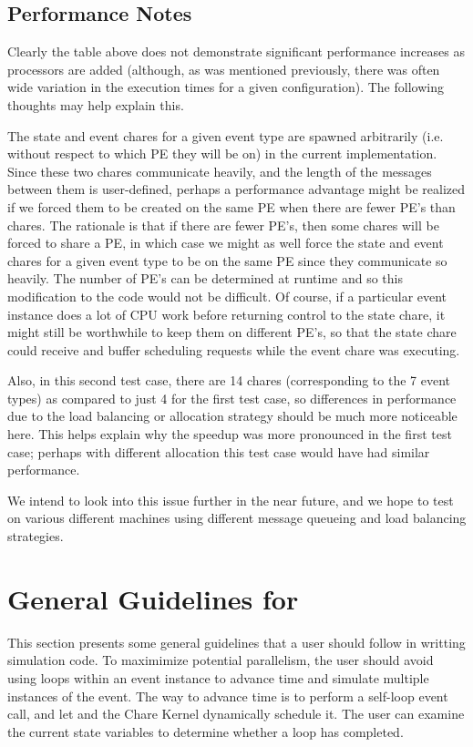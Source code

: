 \subsection{Performance Notes}

Clearly the table above does not demonstrate significant performance
increases as processors are added (although, as was mentioned
previously, there was often wide variation in the execution times for a
given configuration).  The following thoughts may help explain this.

The state and event chares for a given event type are spawned
arbitrarily (i.e. without respect to which PE they will be on) in the
current implementation.  Since these two chares communicate heavily, and
the length of the messages between them is user-defined, perhaps a
performance advantage might be realized if we forced them to be created
on the same PE when there are fewer PE's than chares.  The rationale is
that if there are fewer PE's, then some chares will be forced to share a
PE, in which case we might as well force the state and event chares for
a given event type to be on the same PE since they communicate so
heavily.  The number of PE's can be determined at runtime and so this
modification to the code would not be difficult.  Of course, if a
particular event instance does a lot of CPU work before returning
control to the state chare, it might still be worthwhile to keep them on
different PE's, so that the state chare could receive and buffer
scheduling requests while the event chare was executing.

Also, in this second test case, there are 14 chares (corresponding to
the 7 event types) as compared to just 4 for the first test case, so
differences in performance due to the load balancing or allocation
strategy should be much more noticeable here.  This helps explain why
the speedup was more pronounced in the first test case; perhaps with
different allocation this test case would have had similar performance.

We intend to look into this issue further in the near future, and we hope
to test \dispare on various different machines using different message
queueing and load balancing strategies. 
 
\section{General Guidelines for \dispare}
This section presents some general guidelines that a user should
follow in writting \dispare simulation code.  
To maximimize potential parallelism,
the user should avoid using loops within an event instance to advance
time and simulate multiple instances of the event.
The way to advance time is to
perform a self-loop event call, and let \dispare and the Chare Kernel
dynamically schedule it.  The user can
examine the current state variables to determine whether a loop has
completed.  

